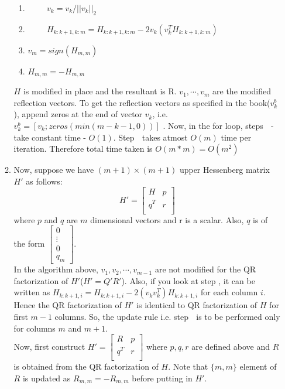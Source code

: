 \documentclass{article}
\begin{document}
\begin{enumerate}
\begin{enumerate}[label=(\alph*)]
\begin{enumerate}
        \item $\qquad$ $v_k = v_k / ||v_k||_2$
        \item $\qquad$ $H_{k : k + 1, k : m} = H_{k : k + 1, k : m} - 2v_k(v_k^TH_{k : k + 1, k : m})$
        \item $v_m = sign(H_{m, m})$
        \item $H_{m, m} = -H_{m, m}$
    \end{enumerate}
    $H$ is modified in place and the resultant is R. $v_1, \cdots, v_m$ are the modified reflection vectors. To get the reflection vectors as specified in the book($v_k^b$), append zeros at the end of vector $v_k$, i.e. $v_k^b = [v_k;zeros(min(m - k - 1, 0))]$ . Now, in the for loop, steps  $\;$ -  $\;$ take constant time - $O(1)$. Step  $\;$ takes atmost $O(m)$ time per iteration. Therefore total time taken is $O(m * m) = O(m^2)$
    \item Now, suppose we have $(m + 1) \times (m + 1)$ upper Hessenberg matrix $H'$ as follows:
    $$H' = \begin{bmatrix}
        H & p\\
        q^T & r\\
    \end{bmatrix}$$
    where $p$ and $q$ are $m$ dimensional vectors and r is a scalar. Also, $q$ is of the form $\begin{bmatrix}
        0\\
        \vdots\\
        0\\
        q_m
    \end{bmatrix}$.\\
    In the algorithm above, $v_1, v_2, \cdots, v_{m - 1}$ are not modified for the QR factorization of $H'$($H' = Q'R'$). Also, if you look at step , it can be written as $H_{k : k + 1, i} = H_{k : k + 1, i} - 2(v_kv_k^T)H_{k : k + 1, i}$ for each column $i$. Hence the QR factorization of $H'$ is identical to QR factorization of $H$ for first $m - 1$ columns. So, the update rule i.e. step  $\;$ is to be performed only for columns $m$ and $m + 1$.\\
    Now, first construct $H' = \begin{bmatrix}
        R & p\\
        q^T & r\\
    \end{bmatrix}$ where $p,q,r$ are defined above and $R$ is obtained from the QR factorization of $H$. Note that $\{m, m\}$ element of $R$ is updated as $R_{m, m} = -R_{m ,m}$ before putting in $H'$.

\end{enumerate}
\end{enumerate}
\end{document}
